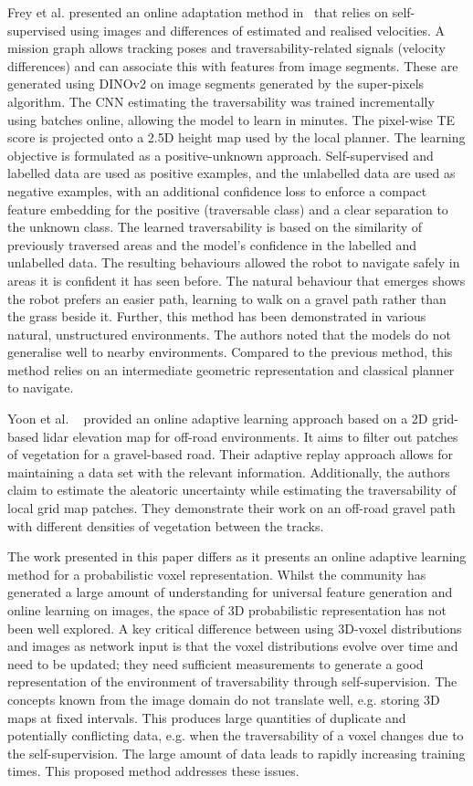 Frey et al. presented an online adaptation method in~\cite{frey2023fast} that relies on self-supervised using images and differences of estimated and realised velocities. A mission graph allows tracking poses and traversability-related signals (velocity differences) and can associate this with features from image segments. These are generated using DINOv2 on image segments generated by the super-pixels algorithm. The CNN estimating the traversability was trained incrementally using batches online, allowing the model to learn in minutes. The pixel-wise \ac{TE} score is projected onto a 2.5D height map used by the local planner. 
The learning objective is formulated as a positive-unknown approach. Self-supervised and labelled data are used as positive examples, and the unlabelled data are used as negative examples, with an additional confidence loss to enforce a compact feature embedding for the positive (traversable class) and a clear separation to the unknown class. The learned traversability is based on the similarity of previously traversed areas and the model's confidence in the labelled and unlabelled data. The resulting behaviours allowed the robot to navigate safely in areas it is confident it has seen before. The natural behaviour that emerges shows the robot prefers an easier path, learning to walk on a gravel path rather than the grass beside it. Further, this method has been demonstrated in various natural, unstructured environments. The authors noted that the models do not generalise well to nearby environments. Compared to the previous method, this method relies on an intermediate geometric representation and classical planner to navigate. 

Yoon et al. ~\cite{yoon2024adaptive} provided an online adaptive learning approach based on a 2D grid-based lidar elevation map for off-road environments. It aims to filter out patches of vegetation for a gravel-based road. Their adaptive replay approach allows for maintaining a data set with the relevant information. Additionally, the authors claim to estimate the aleatoric uncertainty while estimating the traversability of local grid map patches. They demonstrate their work on an off-road gravel path with different densities of vegetation between the tracks.

The work presented in this paper differs as it presents an online adaptive learning method for a probabilistic voxel representation. Whilst the community has generated a large amount of understanding for universal feature generation and online learning on images, the space of 3D probabilistic representation has not been well explored. A key critical difference between using 3D-voxel distributions and images as network input is that the voxel distributions evolve over time and need to be updated; they need sufficient measurements to generate a good representation of the environment of traversability through self-supervision. The concepts known from the image domain do not translate well, e.g. storing 3D maps at fixed intervals. This produces large quantities of duplicate and potentially conflicting data, e.g. when the traversability of a voxel changes due to the self-supervision. The large amount of data leads to rapidly increasing training times. This proposed method addresses these issues.

